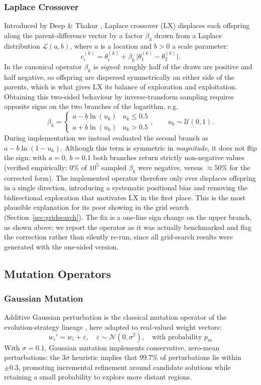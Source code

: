 \documentclass[12pt, a4paper]{article}
\begin{document}
\subsubsection{Laplace Crossover}
Introduced by Deep \& Thakur \cite{deep2007}, Laplace crossover (LX) displaces each offspring along the parent-difference vector by a factor $\beta_k$ drawn from a Laplace distribution $\mathcal{L}(a,b)$, where $a$ is a location and $b>0$ a scale parameter:
\[
c_i^{(k)} = \theta_i^{(k)} + \beta_k\,\bigl|\theta_1^{(k)} - \theta_2^{(k)}\bigr|.
\]
In the canonical operator $\beta_k$ is \emph{signed}: roughly half of the draws are positive and half negative, so offspring are dispersed symmetrically on either side of the parents, which is what gives LX its balance of exploration and exploitation. Obtaining this two-sided behaviour by inverse-transform sampling requires opposite signs on the two branches of the logarithm, e.g.
\[
\beta_k = \begin{cases} a - b\ln(u_k) & u_k \leq 0.5 \\[2pt] a + b\ln(u_k) & u_k > 0.5 \end{cases}, \qquad u_k \sim \mathcal{U}(0,1).
\]
During implementation we instead evaluated the second branch as $a - b\ln(1-u_k)$. Although this term is symmetric in \emph{magnitude}, it does not flip the sign: with $a=0$, $b=0.1$ both branches return strictly non-negative values (verified empirically: $0\%$ of $10^5$ sampled $\beta_k$ were negative, versus $\approx 50\%$ for the corrected form). The implemented operator therefore only ever displaces offspring in a single direction, introducing a systematic positional bias and removing the bidirectional exploration that motivates LX in the first place. This is the most plausible explanation for its poor showing in the grid search (Section~\ref{sec:gridsearch}). The fix is a one-line sign change on the upper branch, as shown above; we report the operator as it was actually benchmarked and flag the correction rather than silently re-run, since all grid-search results were generated with the one-sided version.

\subsection{Mutation Operators}

\subsubsection{Gaussian Mutation}
Additive Gaussian perturbation is the classical mutation operator of the evolution-strategy lineage \cite{back1993}, here adapted to real-valued weight vectors:
\[
w_i' = w_i + \varepsilon, \quad \varepsilon \sim \mathcal{N}(0,\sigma^2), \quad \text{with probability } p_m
\]
With $\sigma=0.1$, Gaussian mutation implements conservative, zero-mean perturbations: the $3\sigma$ heuristic implies that 99.7\% of perturbations lie within $\pm0.3$, promoting incremental refinement around candidate solutions while retaining a small probability to explore more distant regions.
\end{document}
